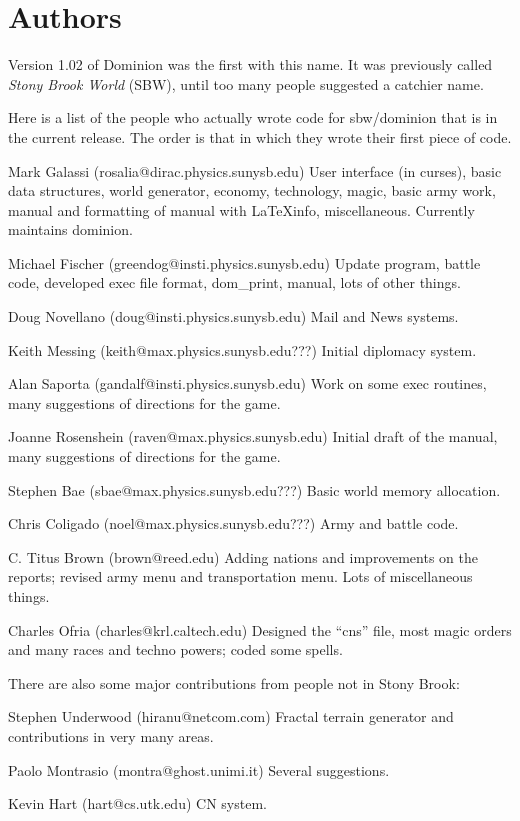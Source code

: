 \chapter{Authors}
Version 1.02 of Dominion was the first with this name.  It was
previously called {\em Stony Brook World} (SBW), until too many people
suggested a catchier name.

Here is a list of the people who actually wrote code for sbw/dominion
that is in the current release.  The order is that in which they wrote
their first piece of code.

Mark Galassi (rosalia@dirac.physics.sunysb.edu) User interface (in
curses), basic data structures, world generator, economy, technology,
magic, basic army work, manual and formatting of manual with
LaTeXinfo, miscellaneous.  Currently maintains dominion.

Michael Fischer (greendog@insti.physics.sunysb.edu) Update program,
battle code, developed exec file format, dom_print, manual, lots of
other things.

Doug Novellano (doug@insti.physics.sunysb.edu) Mail and News systems.

Keith Messing (keith@max.physics.sunysb.edu???) Initial diplomacy system.

Alan Saporta (gandalf@insti.physics.sunysb.edu) Work on some exec
routines, many suggestions of directions for the game.

Joanne Rosenshein (raven@max.physics.sunysb.edu) Initial draft of the
manual, many suggestions of directions for the game.

Stephen Bae (sbae@max.physics.sunysb.edu???) Basic world memory
allocation.

Chris Coligado (noel@max.physics.sunysb.edu???) Army and battle code.

C. Titus Brown (brown@reed.edu) Adding nations and improvements on the
reports; revised army menu and transportation menu.  Lots of
miscellaneous things.

Charles Ofria (charles@krl.caltech.edu) Designed the ``cns'' file,
most magic orders and many races and techno powers; coded some spells.

There are also some major contributions from people not in Stony
Brook:

Stephen Underwood (hiranu@netcom.com) Fractal terrain generator and
contributions in very many areas.

Paolo Montrasio (montra@ghost.unimi.it) Several suggestions.

Kevin Hart (hart@cs.utk.edu) CN system.


